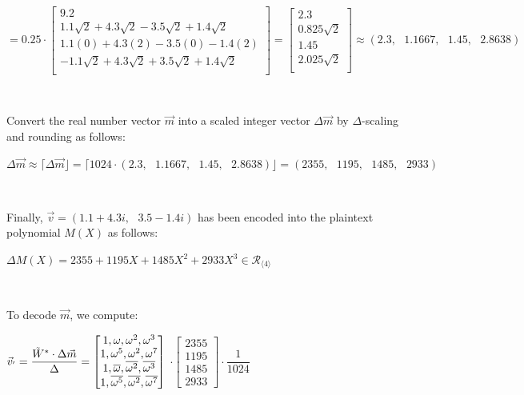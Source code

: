 $ $

$= 0.25 \cdot
\begin{bmatrix}
9.2\\
1.1\sqrt{2} + 4.3{\sqrt{2}} - 3.5\sqrt{2} + 1.4\sqrt{2}\\
1.1(0) + 4.3(2) - 3.5(0) - 1.4(2)\\
-1.1\sqrt{2} + 4.3\sqrt{2} + 3.5\sqrt{2} + 1.4\sqrt{2}\\
\end{bmatrix} =
\begin{bmatrix}
2.3\\
0.825\sqrt{2}\\
1.45\\
2.025\sqrt{2}\\
\end{bmatrix} \approx (2.3, \text{ } 1.1667, \text{ } 1.45, \text{ } 2.8638)$

$ $

Convert the real number vector $\vec{m}$ into a scaled integer vector $\Delta\vec{m}$ by $\Delta$-scaling and rounding as follows:

$\Delta\vec{m} \approx \lceil \Delta \vec{m} \rfloor = \lceil 1024 \cdot (2.3, \text{ } 1.1667, \text{ } 1.45, \text{ } 2.8638) \rfloor = (2355, \text{ } 1195, \text{ } 1485, \text{ } 2933)$

$ $

Finally, $\vec{v} = (1.1 + 4.3i, \text{ } 3.5 - 1.4i)$ has been encoded into the plaintext polynomial $M(X)$ as follows:

$\Delta M(X) = 2355 +  1195X + 1485X^2 + 2933X^3 \in \mathcal{R}_{\langle 4 \rangle}$

$ $


To decode $\vec{m}$, we compute:

$\vec{v}_{'} = \dfrac{\tilde W^*\cdot\Delta\vec{m}}{\Delta} = \begin{bmatrix}
1,\omega,\omega^2, \omega^3\\
1,\omega^5, \omega^2,\omega^7\\
1,\overline{\omega}, \overline{\omega^2}, \overline{\omega^3}\\
1,\overline{\omega^5}, \overline{\omega^2}, \overline{\omega^7}
\end{bmatrix}$
$\cdot \begin{bmatrix}
2355\\1195\\1485\\2933
\end{bmatrix}\cdot \dfrac{1}{1024}$

